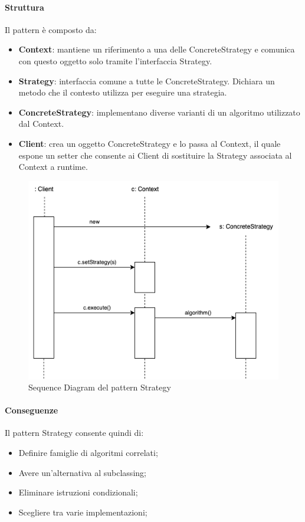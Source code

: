 \paragraph{Struttura} Il pattern è composto da:
\begin{itemize}
    \item \textbf{Context}: mantiene un riferimento a una delle ConcreteStrategy e comunica con questo oggetto solo tramite l’interfaccia Strategy.
    \item \textbf{Strategy}: interfaccia comune a tutte le ConcreteStrategy. Dichiara un metodo che il contesto utilizza per eseguire una strategia.
    \item \textbf{ConcreteStrategy}: implementano diverse varianti di un algoritmo utilizzato dal Context.
    \item \textbf{Client}: crea un oggetto ConcreteStrategy e lo passa al Context, il quale espone un setter che consente ai Client di sostituire la Strategy associata al Context a runtime.
\end{itemize}

\begin{figure}[H]
    \centering
    \includegraphics[width=0.5\linewidth]{assets/pattern/strategy/strategy-sequence.drawio.png}
    \caption{Sequence Diagram del pattern Strategy}
\end{figure}

\paragraph{Conseguenze} Il pattern Strategy consente quindi di:
\begin{itemize}
    \item Definire famiglie di algoritmi correlati;
    \item Avere un'alternativa al subclassing;
    \item Eliminare istruzioni condizionali;
    \item Scegliere tra varie implementazioni;
\end{itemize}

